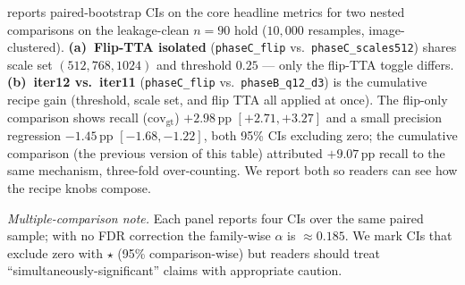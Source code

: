 \documentclass{article}
\begin{document}
 reports paired-bootstrap CIs on the core
headline metrics for two nested comparisons on the leakage-clean $n{=}90$
hold ($10{,}000$ resamples, image-clustered).
\textbf{(a)~Flip-TTA isolated} (\texttt{phaseC\_flip} vs.\
\texttt{phaseC\_scales512}) shares scale set $(512,768,1024)$ and
threshold $0.25$ — only the flip-TTA toggle differs.
\textbf{(b)~iter12 vs.\ iter11} (\texttt{phaseC\_flip} vs.\
\texttt{phaseB\_q12\_d3}) is the cumulative recipe gain
(threshold, scale set, and flip TTA all applied at once).
The flip-only comparison shows recall ($\mathrm{cov}_{\mathrm{gt}}$)
$+2.98$\,pp $[+2.71, +3.27]$ and a small precision regression
$-1.45$\,pp $[-1.68, -1.22]$, both 95\% CIs excluding zero; the
cumulative comparison (the previous version of this table) attributed
$+9.07$\,pp recall to the same mechanism, three-fold over-counting.
We report both so readers can see how the recipe knobs compose.

\emph{Multiple-comparison note.} Each panel reports four CIs over
the same paired sample; with no FDR correction the family-wise
$\alpha$ is $\approx 0.185$. We mark CIs that exclude zero with
$\star$ (95\% comparison-wise) but readers should treat
``simultaneously-significant'' claims with appropriate caution.
\end{document}
